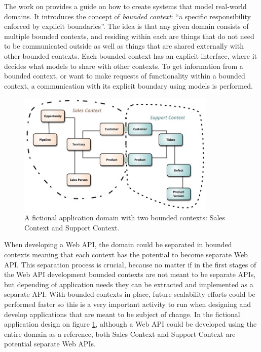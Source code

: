 \documentclass[10pt,article]{IEEEtran}
\begin{document}
The work on \cite{evans:ddd} provides a guide on how to create systems that model real-world domains. It introduces the concept of \textit{bounded context}: ``a specific responsibility enforced by explicit boundaries''. The idea is that any given domain consists of multiple bounded contexts, and residing within each are things that do not need to be communicated outside as well as things that are shared externally with other bounded contexts. Each bounded context has an explicit interface, where it decides what models to share with other contexts.
To get information from a bounded context, or want to make requests of functionality within a bounded context, a communication with its explicit boundary using models is performed.

\begin{figure}[h]
    \hspace{-0.5cm}
    \includegraphics[width=9.5cm]{bounded-context}
    \caption{A fictional application domain with two bounded contexts: Sales Context and Support Context.\cite{fowler:bounded-context}}
    \label{fig:bounded-context}
\end{figure}


When developing a Web API, the domain could be separated in bounded contexts meaning that each context has the potential to become separate Web API. This separation process is crucial, because no matter if in the first stages of the Web API development bounded contexts are not meant to be separate APIs, but depending of application needs they can be extracted and implemented as a separate API. With bounded contexts in place, future scalability efforts could be performed faster so this is a very important activity to run when designing and develop applications that are meant to be subject of change. In the fictional application design on figure \ref{fig:bounded-context}, although a Web API could be developed using the entire domain as a reference, both Sales Context and Support Context are potential separate Web APIs. 
\end{document}
